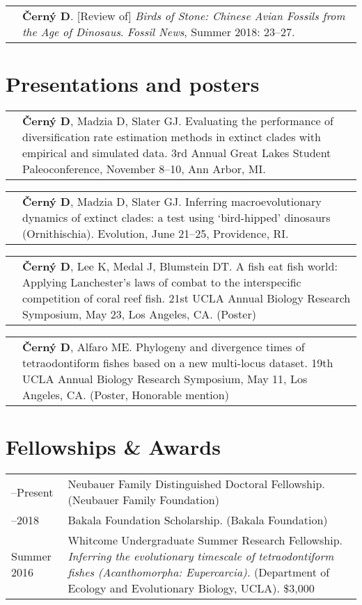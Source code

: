 \documentclass[10pt]{article}
\begin{document}
\begin{tabularx}{\textwidth}{>{\raggedleft\arraybackslash}p{2.2cm} X}
2018 & \textbf{\v{C}ern\'{y} D}. [Review of] \textit{Birds of Stone: Chinese Avian Fossils from the Age of Dinosaus}. \textit{Fossil News}, Summer 2018: 23--27.
\end{tabularx}

\section*{Presentations and posters}

\begin{tabularx}{\textwidth}{>{\raggedleft\arraybackslash}p{2.2cm} X}
2019 & \textbf{\v{C}ern\'{y} D}, Madzia D, Slater GJ. Evaluating the performance of diversification rate estimation methods in extinct clades with empirical and simulated data. 3rd Annual Great Lakes Student Paleoconference, November 8--10, Ann Arbor, MI.
\end{tabularx}
\begin{tabularx}{\textwidth}{>{\raggedleft\arraybackslash}p{2.2cm} X}
2019 & \textbf{\v{C}ern\'{y} D}, Madzia D, Slater GJ. Inferring macroevolutionary dynamics of extinct clades: a test using `bird-hipped' dinosaurs (Ornithischia). Evolution, June 21--25, Providence, RI.
\end{tabularx}
\begin{tabularx}{\textwidth}{>{\raggedleft\arraybackslash}p{2.2cm} X}
2018 & \textbf{\v{C}ern\'{y} D}, Lee K, Medal J, Blumstein DT. A fish eat fish world: Applying Lanchester's laws of combat to the interspecific competition of coral reef fish. 21st UCLA Annual Biology Research Symposium, May 23, Los Angeles, CA. (Poster)
\end{tabularx}
\begin{tabularx}{\textwidth}{>{\raggedleft\arraybackslash}p{2.2cm} X}
2016 & \textbf{\v{C}ern\'{y} D}, Alfaro ME. Phylogeny and divergence times of tetraodontiform fishes based on a new multi-locus dataset. 19th UCLA Annual Biology Research Symposium, May 11, Los Angeles, CA. (Poster, Honorable mention)
\end{tabularx}

\section*{Fellowships \& Awards}

\begin{tabularx}{\textwidth}{>{\raggedleft\arraybackslash}p{2.2cm} X}
2018--Present & Neubauer Family Distinguished Doctoral Fellowship. (Neubauer Family Foundation) \\[0.1cm]
2014--2018 & Bakala Foundation Scholarship. (Bakala Foundation) \\[0.1cm]
Summer 2016 & Whitcome Undergraduate Summer Research Fellowship. \textit{Inferring the evolutionary timescale of tetraodontiform fishes (Acanthomorpha: Eupercarcia).} (Department of Ecology and Evolutionary Biology, UCLA). \$3,000 
\end{tabularx}
\end{document}

